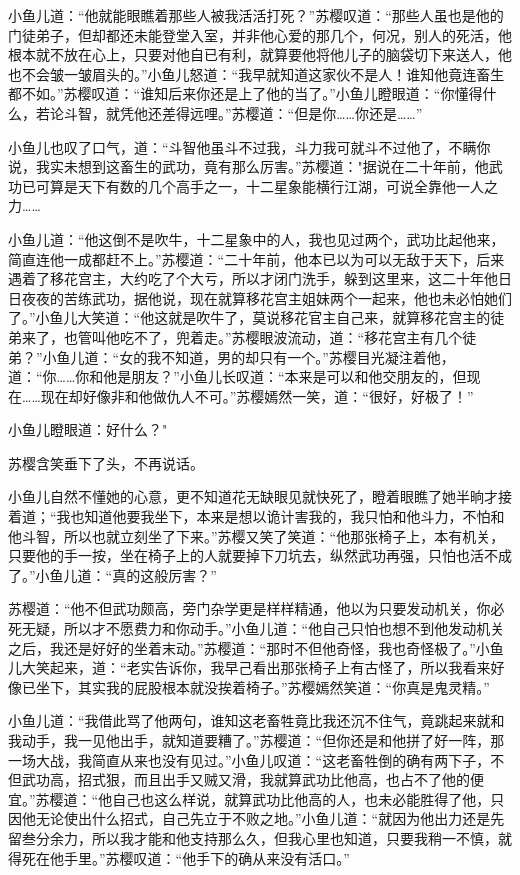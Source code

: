 \documentclass[12pt,oneside]{book}
\begin{document}
小鱼儿道：``他就能眼瞧着那些人被我活活打死？''苏樱叹道：``那些人虽也是他的门徒弟子，但却都还未能登堂入室，并非他心爱的那几个，何况，别人的死活，他根本就不放在心上，只要对他自已有利，就算要他将他儿子的脑袋切下来送人，他也不会皱一皱眉头的。''小鱼儿怒道：``我早就知道这家伙不是人！谁知他竟连畜生都不如。''苏樱叹道：``谁知后来你还是上了他的当了。''小鱼儿瞪眼道：``你懂得什么，若论斗智，就凭他还差得远哩。''苏樱道：``但是你\ldots\ldots 你还是\ldots\ldots{}''

小鱼儿也叹了口气，道：``斗智他虽斗不过我，斗力我可就斗不过他了，不瞒你说，我实未想到这畜生的武功，竟有那么厉害。''苏樱道："据说在二十年前，他武功已可算是天下有数的几个高手之一，十二星象能横行江湖，可说全靠他一人之力\ldots\ldots{}

小鱼儿道：``他这倒不是吹牛，十二星象中的人，我也见过两个，武功比起他来，简直连他一成都赶不上。''苏樱道：``二十年前，他本已以为可以无敌于天下，后来遇着了移花宫主，大约吃了个大亏，所以才闭门洗手，躲到这里来，这二十年他日日夜夜的苦练武功，据他说，现在就算移花宫主姐妹两个一起来，他也未必怕她们了。''小鱼儿大笑道：``他这就是吹牛了，莫说移花官主自己来，就算移花宫主的徒弟来了，也管叫他吃不了，兜着走。''苏樱眼波流动，道：``移花宫主有几个徒弟？''小鱼儿道：``女的我不知道，男的却只有一个。''苏樱目光凝注着他，道：``你\ldots\ldots 你和他是朋友？''小鱼儿长叹道：``本来是可以和他交朋友的，但现在\ldots\ldots 现在却好像非和他做仇人不可。''苏樱嫣然一笑，道：``很好，好极了！''

小鱼儿瞪眼道：好什么？"

苏樱含笑垂下了头，不再说话。

小鱼儿自然不懂她的心意，更不知道花无缺眼见就快死了，瞪着眼瞧了她半晌才接着道；``我也知道他要我坐下，本来是想以诡计害我的，我只怕和他斗力，不怕和他斗智，所以也就立刻坐了下来。''苏樱又笑了笑道：``他那张椅子上，本有机关，只要他的手一按，坐在椅子上的人就要掉下刀坑去，纵然武功再强，只怕也活不成了。''小鱼儿道：``真的这般厉害？''

苏樱道：``他不但武功颇高，旁门杂学更是样样精通，他以为只要发动机关，你必死无疑，所以才不愿费力和你动手。''小鱼儿道：``他自己只怕也想不到他发动机关之后，我还是好好的坐着末动。''苏樱道：``那时不但他奇怪，我也奇怪极了。''小鱼儿大笑起来，道：``老实告诉你，我早己看出那张椅子上有古怪了，所以我看来好像已坐下，其实我的屁股根本就没挨着椅子。''苏樱嫣然笑道：``你真是鬼灵精。''

小鱼儿道：``我借此骂了他两句，谁知这老畜牲竟比我还沉不住气，竟跳起来就和我动手，我一见他出手，就知道要糟了。''苏樱道：``但你还是和他拼了好一阵，那一场大战，我简直从来也没有见过。''小鱼儿叹道：``这老畜牲倒的确有两下子，不但武功高，招式狠，而且出手又贼又滑，我就算武功比他高，也占不了他的便宜。''苏樱道：``他自己也这么样说，就算武功比他高的人，也未必能胜得了他，只因他无论使出什么招式，自己先立于不败之地。''小鱼儿道：``就因为他出力还是先留叁分余力，所以我才能和他支持那么久，但我心里也知道，只要我稍一不慎，就得死在他手里。''苏樱叹道：``他手下的确从来没有活口。''
\end{document}
